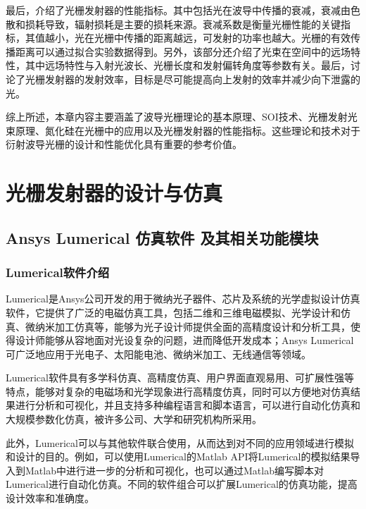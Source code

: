 \documentclass[UTF8,a4paper,12pt]{ctexart}
\numberwithin{equation}{section}
\begin{document}
最后，介绍了光栅发射器的性能指标。其中包括光在波导中传播的衰减，衰减由色散和损耗导致，辐射损耗是主要的损耗来源。衰减系数是衡量光栅性能的关键指标，其值越小，光在光栅中传播的距离越远，可发射的功率也越大。光栅的有效传播距离可以通过拟合实验数据得到。另外，该部分还介绍了光束在空间中的远场特性，其中远场特性与入射光波长、光栅长度和发射偏转角度等参数有关。最后，讨论了光栅发射器的发射效率，目标是尽可能提高向上发射的效率并减少向下泄露的光。

综上所述，本章内容主要涵盖了波导光栅理论的基本原理、SOI技术、光栅发射光束原理、氮化硅在光栅中的应用以及光栅发射器的性能指标。这些理论和技术对于衍射波导光栅的设计和性能优化具有重要的参考价值。














\newpage
{}
\section{光栅发射器的设计与仿真}
\subsection{Ansys Lumerical 仿真软件 及其相关功能模块}
\subsubsection{Lumerical软件介绍}
Lumerical是Ansys公司开发的用于微纳光子器件、芯片及系统的光学虚拟设计仿真软件，它提供了广泛的电磁仿真工具，包括二维和三维电磁模拟、光学设计和仿真、微纳米加工仿真等，能够为光子设计师提供全面的高精度设计和分析工具，使得设计师能够从容地面对光设复杂的问题，进而降低开发成本；Ansys Lumerical可广泛地应用于光电子、太阳能电池、微纳米加工、无线通信等领域。

Lumerical软件具有多学科仿真、高精度仿真、用户界面直观易用、可扩展性强等特点，能够对复杂的电磁场和光学现象进行高精度仿真，同时可以方便地对仿真结果进行分析和可视化，并且支持多种编程语言和脚本语言，可以进行自动化仿真和大规模参数化仿真，被许多公司、大学和研究机构所采用。

此外，Lumerical可以与其他软件联合使用，从而达到对不同的应用领域进行模拟和设计的目的。例如，可以使用Lumerical的Matlab API将Lumerical的模拟结果导入到Matlab中进行进一步的分析和可视化，也可以通过Matlab编写脚本对Lumerical进行自动化仿真。不同的软件组合可以扩展Lumerical的仿真功能，提高设计效率和准确度。
\end{document}
